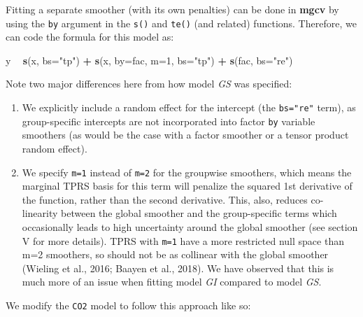 \documentclass[12pt]{article}
\newenvironment{Shaded}{\begin{snugshade}}{\end{snugshade}}
\newcommand{\KeywordTok}[1]{\textcolor[rgb]{0.13,0.29,0.53}{\textbf{#1}}}
\newcommand{\DataTypeTok}[1]{\textcolor[rgb]{0.13,0.29,0.53}{#1}}
\newcommand{\DecValTok}[1]{\textcolor[rgb]{0.00,0.00,0.81}{#1}}
\newcommand{\StringTok}[1]{\textcolor[rgb]{0.31,0.60,0.02}{#1}}
\newcommand{\OperatorTok}[1]{\textcolor[rgb]{0.81,0.36,0.00}{\textbf{#1}}}
\newcommand{\NormalTok}[1]{#1}
\providecommand{\tightlist}{%
  \setlength{\itemsep}{0pt}\setlength{\parskip}{0pt}}
\begin{document}
Fitting a separate smoother (with its own penalties) can be done in
\textbf{mgcv} by using the \texttt{by} argument in the \texttt{s()} and
\texttt{te()} (and related) functions. Therefore, we can code the
formula for this model as:

\begin{Shaded}
\begin{Highlighting}[]
\NormalTok{y }\OperatorTok{~}\StringTok{ }\KeywordTok{s}\NormalTok{(x, }\DataTypeTok{bs=}\StringTok{"tp"}\NormalTok{) }\OperatorTok{+}\StringTok{ }\KeywordTok{s}\NormalTok{(x, }\DataTypeTok{by=}\NormalTok{fac, }\DataTypeTok{m=}\DecValTok{1}\NormalTok{, }\DataTypeTok{bs=}\StringTok{"tp"}\NormalTok{) }\OperatorTok{+}\StringTok{ }\KeywordTok{s}\NormalTok{(fac, }\DataTypeTok{bs=}\StringTok{"re"}\NormalTok{)}
\end{Highlighting}
\end{Shaded}

Note two major differences here from how model \emph{GS} was specified:

\begin{enumerate}
\def\labelenumi{\arabic{enumi}.}
\tightlist
\item
  We explicitly include a random effect for the intercept (the
  \texttt{bs="re"} term), as group-specific intercepts are not
  incorporated into factor \texttt{by} variable smoothers (as would be
  the case with a factor smoother or a tensor product random effect).
\item
  We specify \texttt{m=1} instead of \texttt{m=2} for the groupwise
  smoothers, which means the marginal TPRS basis for this term will
  penalize the squared 1st derivative of the function, rather than the
  second derivative. This, also, reduces co-linearity between the global
  smoother and the group-specific terms which occasionally leads to high
  uncertainty around the global smoother (see section V for more
  details). TPRS with \texttt{m=1} have a more restricted null space
  than m=2 smoothers, so should not be as collinear with the global
  smoother (Wieling et al., 2016; Baayen et al., 2018). We have observed
  that this is much more of an issue when fitting model \emph{GI}
  compared to model \emph{GS}.
\end{enumerate}

We modify the \texttt{CO2} model to follow this approach like so:
\end{document}
